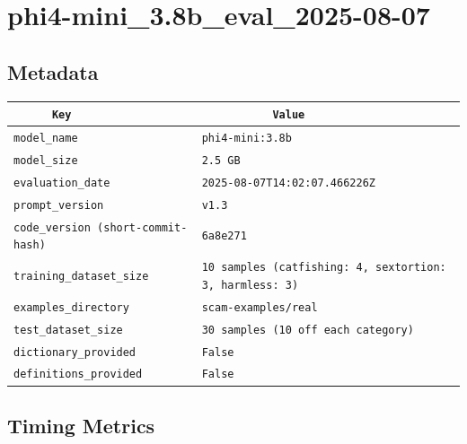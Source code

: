 \documentclass{article}
\begin{document}
\section{phi4-mini\_3.8b\_eval\_2025-08-07}
\subsection{Metadata}

\begin{center}
\begin{tabular}{l | l} \hline
    \verb|      Key      | & \verb|           Value           | \\ \hline
    \hline
    \verb|model_name    | & \verb|phi4-mini:3.8b               | \\ \hline
    \verb|model_size    | & \verb|2.5 GB                       | \\ \hline
    \verb|evaluation_date| & \verb|2025-08-07T14:02:07.466226Z  | \\ \hline
    \verb|prompt_version| & \verb|v1.3                         | \\ \hline
    \verb|code_version (short-commit-hash)| & \verb|6a8e271                      | \\ \hline
    \verb|training_dataset_size| & \verb|10 samples (catfishing: 4, sextortion: 3, harmless: 3)| \\ \hline
    \verb|examples_directory| & \verb|scam-examples/real           | \\ \hline
    \verb|test_dataset_size| & \verb|30 samples (10 off each category)| \\ \hline
    \verb|dictionary_provided| & \verb|False                        | \\ \hline
    \verb|definitions_provided| & \verb|False                        | \\ \hline
\end{tabular}
\end{center}

\subsection{Timing Metrics}
\end{document}
